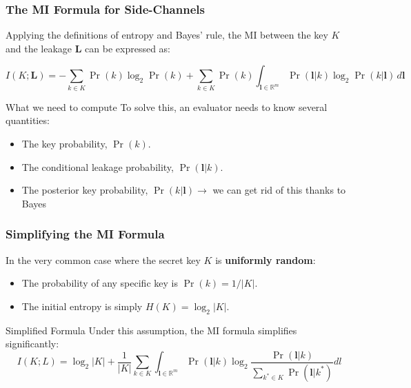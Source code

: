 \begin{frame}
    \frametitle{The MI Formula for Side-Channels}
    
        Applying the definitions of entropy and Bayes' rule, the MI between the key $K$ and the leakage $\mathbf{L}$ can be expressed as:
        
        $$ I(K;\mathbf{L}) = - \sum_{k \in K} \Pr(k)\log_2\Pr(k) + \sum_{k \in K} \Pr(k) \int_{\mathbf{l} \in \mathbb{R}^m} \Pr(\mathbf{l}|k) \log_2 \Pr(k|\mathbf{l}) \, d\mathbf{l} $$
    
    \begin{block}{What we need to compute}
        To solve this, an evaluator needs to know several quantities:
        \begin{itemize}
            \item The key probability, $\Pr(k)$.
            \item The conditional leakage probability, $\Pr(\mathbf{l}|k)$.
            \item The posterior key probability, $\Pr(k|\mathbf{l}) \rightarrow$ we can get rid of this thanks to Bayes
        \end{itemize}
    \end{block}
\end{frame}

\begin{frame}
    \frametitle{Simplifying the MI Formula}
    
        In the very common case where the secret key $K$ is \textbf{uniformly random}:
        \begin{itemize}
            \item The probability of any specific key is $\Pr(k) = 1 / |K|$.
            \item The initial entropy is simply $H(K) = \log_2 |K|$.
        \end{itemize}
    
    \begin{block}{Simplified Formula}
        Under this assumption, the MI formula simplifies significantly:
        $$ I(K;L) = \log_2|K| + \frac{1}{|K|} \sum_{k \in K} \int_{\mathbf{l} \in \mathbb{R}^m} \Pr(\mathbf{l}|k) \log_2  \frac{\Pr(\mathbf{l}|k)}{\sum_{k^* \in K} \Pr(\mathbf{l}|k^*)}  dl $$
    \end{block}
\end{frame}

